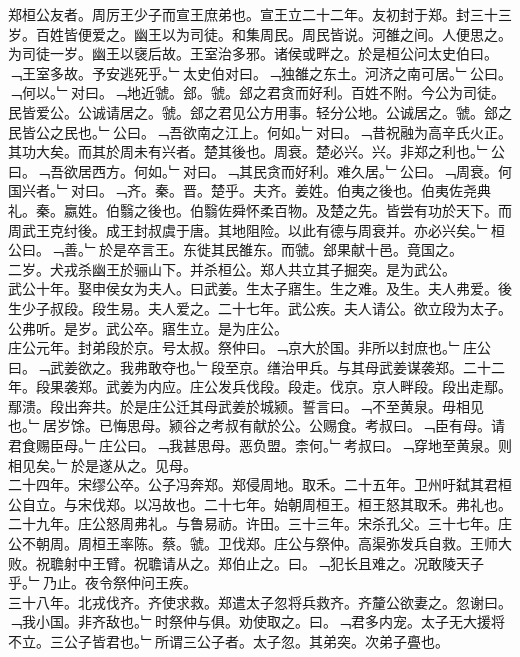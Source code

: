 \documentclass{zhvt-classic}
\begin{document}
\hspace*{2em}郑桓公友者。周厉王少子而宣王庶弟也。宣王立二十二年。友初封于郑。封三十三岁。百姓皆便爱之。幽王以为司徒。和集周民。周民皆说。河雒之间。人便思之。为司徒一岁。幽王以襃后故。王室治多邪。诸侯或畔之。於是桓公问太史伯曰。﹁王室多故。予安逃死乎。﹂太史伯对曰。﹁独雒之东土。河济之南可居。﹂公曰。﹁何以。﹂对曰。﹁地近虢。郐。虢。郐之君贪而好利。百姓不附。今公为司徒。民皆爱公。公诚请居之。虢。郐之君见公方用事。轻分公地。公诚居之。虢。郐之民皆公之民也。﹂公曰。﹁吾欲南之江上。何如。﹂对曰。﹁昔祝融为高辛氏火正。其功大矣。而其於周未有兴者。楚其後也。周衰。楚必兴。兴。非郑之利也。﹂公曰。﹁吾欲居西方。何如。﹂对曰。﹁其民贪而好利。难久居。﹂公曰。﹁周衰。何国兴者。﹂对曰。﹁齐。秦。晋。楚乎。夫齐。姜姓。伯夷之後也。伯夷佐尧典礼。秦。嬴姓。伯翳之後也。伯翳佐舜怀柔百物。及楚之先。皆尝有功於天下。而周武王克纣後。成王封叔虞于唐。其地阻险。以此有德与周衰并。亦必兴矣。﹂桓公曰。﹁善。﹂於是卒言王。东徙其民雒东。而虢。郐果献十邑。竟国之。\\
\hspace*{2em}二岁。犬戎杀幽王於骊山下。并杀桓公。郑人共立其子掘突。是为武公。\\
\hspace*{2em}武公十年。娶申侯女为夫人。曰武姜。生太子寤生。生之难。及生。夫人弗爱。後生少子叔段。段生易。夫人爱之。二十七年。武公疾。夫人请公。欲立段为太子。公弗听。是岁。武公卒。寤生立。是为庄公。\\
\hspace*{2em}庄公元年。封弟段於京。号太叔。祭仲曰。﹁京大於国。非所以封庶也。﹂庄公曰。﹁武姜欲之。我弗敢夺也。﹂段至京。缮治甲兵。与其母武姜谋袭郑。二十二年。段果袭郑。武姜为内应。庄公发兵伐段。段走。伐京。京人畔段。段出走鄢。鄢溃。段出奔共。於是庄公迁其母武姜於城颍。誓言曰。﹁不至黄泉。毋相见也。﹂居岁馀。已悔思母。颍谷之考叔有献於公。公赐食。考叔曰。﹁臣有母。请君食赐臣母。﹂庄公曰。﹁我甚思母。恶负盟。柰何。﹂考叔曰。﹁穿地至黄泉。则相见矣。﹂於是遂从之。见母。\\
\hspace*{2em}二十四年。宋缪公卒。公子冯奔郑。郑侵周地。取禾。二十五年。卫州吁弑其君桓公自立。与宋伐郑。以冯故也。二十七年。始朝周桓王。桓王怒其取禾。弗礼也。二十九年。庄公怒周弗礼。与鲁易祊。许田。三十三年。宋杀孔父。三十七年。庄公不朝周。周桓王率陈。蔡。虢。卫伐郑。庄公与祭仲。高渠弥发兵自救。王师大败。祝聸射中王臂。祝聸请从之。郑伯止之。曰。﹁犯长且难之。况敢陵天子乎。﹂乃止。夜令祭仲问王疾。\\
\hspace*{2em}三十八年。北戎伐齐。齐使求救。郑遣太子忽将兵救齐。齐釐公欲妻之。忽谢曰。﹁我小国。非齐敌也。﹂时祭仲与俱。劝使取之。曰。﹁君多内宠。太子无大援将不立。三公子皆君也。﹂所谓三公子者。太子忽。其弟突。次弟子亹也。\\
\end{document}
